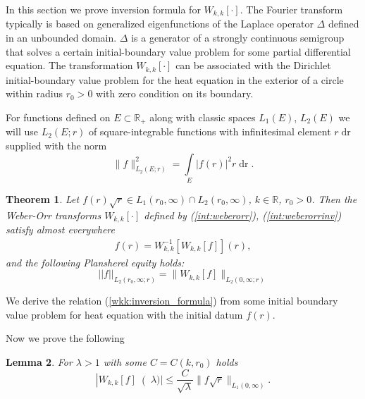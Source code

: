 \documentclass[manuscript, printscheme]{paper}
\newtheorem{thm}{Theorem}[section]
\newtheorem{lem}[thm]{Lemma}
\newcommand{\RM}{\mathbb{R}}
\newcommand{\dr}{\operatorname{dr}}
\begin{document}
In this section we prove inversion formula for $W_{k,k}[\cdot]$. The Fourier transform typically is based on generalized eigenfunctions of the Laplace operator $\Delta$ defined in an unbounded domain. $\Delta$ is a generator of a strongly continuous semigroup that solves a certain initial-boundary value problem for some partial differential equation. The transformation $W_{k,k}[\cdot]$ can be associated with the Dirichlet initial-boundary value problem for the heat equation in the exterior of a circle within radius $r_0>0$ with zero condition on its boundary. 

For functions defined on $E\subset \RM_+$ along with classic spaces $L_1(E)$, $L_2(E)$ we will use $L_2(E; r)$ of square-integrable functions with  infinitesimal element $r\dr$ supplied with the norm
$$
\|f\|^2_{L_2(E; r)}=\int\limits_E |f(r)|^2 r\dr.
$$

\begin{thm}\label{wkk:thm}Let $f(r) \sqrt r \in L_1(r_0,\infty)\cap L_2(r_0,\infty)$, $k \in \RM$, $r_0>0$. Then the  Weber-Orr transforms $W_{k,k}[\cdot]$ defined by (\ref{int:weberorr}), (\ref{int:weberorrinv}) satisfy  almost everywhere 
\begin{align}\label{wkk:inversion_formula}
f(r) = W^{-1}_{k,k}\left [W_{k,k} [f] \right ](r), 
\end{align}
and the following Plansherel equity holds:
$$
||f||_{L_2(r_0,\infty; r)} = \| W_{k,k}[f] \|_{L_2(0,\infty; r) } 
$$
\end{thm}

We derive the relation (\ref{wkk:inversion_formula}) from some initial boundary value problem for heat equation with the initial datum $f(r)$. 


Now we prove the following 
\begin{lem} \label{wkk:lemest} For $\lambda>1$ with some $C=C(k, r_0)$ holds
$$\left |W_{k,k} [f] \right (\lambda) | \leq \frac C {\sqrt \lambda} \|f \sqrt r \|_{L_1(0,\infty)}. $$ 
\end{lem}
\end{document}

